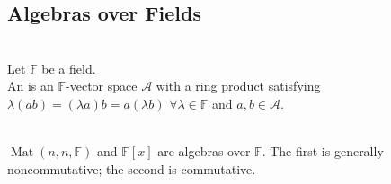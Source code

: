 \subsection{Algebras over Fields}

\begin{definition} \label{def:algebra-over-field} \\
Let $\mathbb{F}$ be a field.\\
An  is an $\mathbb{F}$-vector space $\mathcal{A}$ with a ring product satisfying $\lambda(ab)=(\lambda a)b=a(\lambda b)$ $\forall \lambda\in\mathbb{F}$ and $a,b\in\mathcal{A}$.
\end{definition}

\begin{example} \label{ex:matrix-and-polynomial-algebras} \\
$\operatorname{Mat}(n,n,\mathbb{F})$ and $\mathbb{F}[x]$ are algebras over $\mathbb{F}$. The first is generally noncommutative; the second is commutative.
\end{example}
